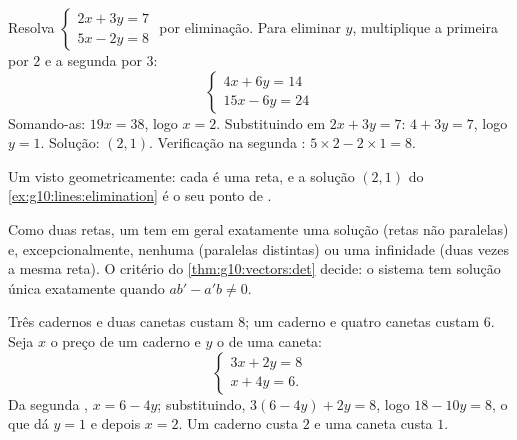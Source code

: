 \begin{example}\label{ex:g10:lines:elimination}
Resolva $\begin{cases} 2x + 3y = 7 \\ 5x - 2y = 8 \end{cases}$ por
eliminação. Para eliminar $y$, multiplique a primeira  por $2$ e a
segunda por $3$:
\[
\begin{cases}
4x + 6y = 14 \\
15x - 6y = 24
\end{cases}
\]
Somando-as: $19x = 38$, logo $x = 2$. Substituindo em $2x + 3y = 7$:
$4 + 3y = 7$, logo $y = 1$. Solução: $(2, 1)$. Verificação na segunda
: $5 \times 2 - 2 \times 1 = 8$.
\end{example}

\begin{omfigure}

{\small Um  visto geometricamente: cada  é uma reta,
e a solução $(2,1)$ do \cref{ex:g10:lines:elimination} é o seu ponto de
.}
\end{omfigure}

\begin{remark}
Como duas retas, um  tem em geral exatamente uma solução
(retas não paralelas) e, excepcionalmente, nenhuma (paralelas distintas)
ou uma infinidade (duas vezes a mesma reta). O critério do
\cref{thm:g10:vectors:det} decide: o sistema tem solução única
exatamente quando $ab' - a'b \neq 0$.
\end{remark}

\begin{example}\label{ex:g10:lines:modeling}
Três cadernos e duas canetas custam $8$; um caderno e quatro canetas
custam $6$. Seja $x$ o preço de um caderno e $y$ o de uma caneta:
\[
\begin{cases}
3x + 2y = 8 \\
x + 4y = 6 .
\end{cases}
\]
Da segunda , $x = 6 - 4y$; substituindo, $3(6 - 4y) + 2y = 8$,
logo $18 - 10y = 8$, o que dá $y = 1$ e depois $x = 2$. Um caderno custa
$2$ e uma caneta custa $1$.
\end{example}

